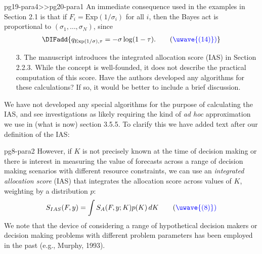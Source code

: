 \documentclass{article}
\begin{document}
\begin{mybox}{pg19-para4>>pg20-para1}
  An immediate consequence used in the examples in Section 2.1 is that if
  $F_i = \mathrm{Exp}(1/\sigma_i)$ for all $i$, then the Bayes act is proportional to $(\sigma_1,\ldots,\sigma_N)$, since
  \DIFdelbegin {}\DIFdelend \DIFaddbegin \begin{align}
  \DIFadd{q_{\mathrm{Exp}(1/\sigma),\tau} = -\sigma \log(1-\tau). \tag{\color{blue}{\uwave{(14)}}}
}\end{align}
  \DIFaddend 
\end{mybox}


\begin{quotebar}
\begin{enumerate}
  \item[3.] The manuscript introduces the integrated allocation score (IAS) in Section 2.2.3. While the concept is well-founded, it does not describe the practical computation of this score. Have the authors developed any algorithms for these calculations? If so, it would be better to include a brief discussion.
\end{enumerate}
\end{quotebar}

We have not developed any special algorithms for the purpose of calculating the IAS, and see investigations as likely requiring 
the kind of \textit{ad hoc} approximation we use in (what is now) section 3.5.5.  To clarify this we have added text after our definition of the IAS:

\begin{mybox}{pg8-para2}
 However, if $K$ is not precisely known at the time of decision making or there is interest in measuring the
value of forecasts across a range of decision making scenarios with different resource constraints, we can use an
\emph{integrated allocation score} (IAS) that integrates the allocation score across values of $K$, weighting by a
distribution $p$:
\begin{equation}
S_{IAS}(F, y) = \int S_A(F,y; K) p(K) \, dK \tag{\color{blue}{\uwave{(8)}}} 
\end{equation} 
We note that the device of considering a range of hypothetical decision makers or decision making problems with
different problem parameters has been employed in the past (e.g., Murphy, 1993).

\DIFaddbegin {}
\DIFaddend 
\end{mybox}
\end{document}
